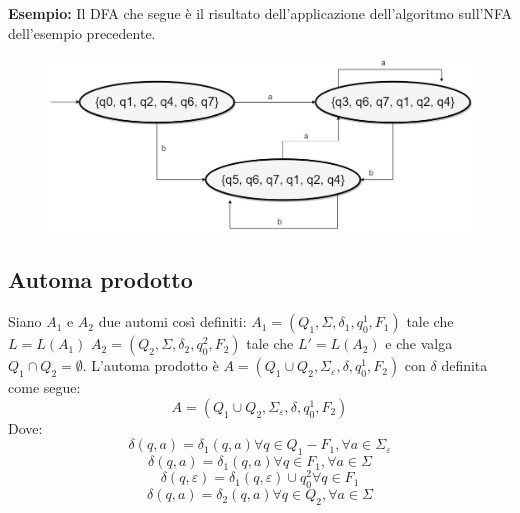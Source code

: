 \textbf{Esempio:} Il DFA che segue \`e il risultato dell'applicazione dell'algoritmo sull'NFA dell'esempio precedente. \newline
\begin{figure}[H]
	\includegraphics[scale=0.35]{l5_3}
\end{figure}
\subsection{Automa prodotto}
Siano $A_1$ e $A_2$ due automi cos\`i definiti:\newline
$A_1 = (Q_1, \Sigma, \delta_1, q^1_0,F_1)$ tale che $L = L(A_1)$ \newline $A_2 = (Q_2, \Sigma, \delta_2, q^2_0,F_2)$ tale che $L' = L(A_2)$  \newline
e che valga $Q_1 \cap Q_2 = \emptyset$. \newline
L'automa prodotto \`e $A = (Q_1 \cup Q_2, \Sigma_{\varepsilon}, \delta, q^1_0, F_2)$ con $\delta$ definita come segue:
\[
	A = (Q_1 \cup Q_2, \Sigma_{\varepsilon}, \delta, q_0^1, F_2)
\]
Dove:
\[
	\delta(q,a) = \delta_1(q,a) \forall  q \in Q_1-F_1, \forall a \in \Sigma_{\varepsilon}
\]
\[
	\delta(q,a) = \delta_1(q,a) \forall  q \in F_1, \forall a \in \Sigma
\]
\[
	\delta(q,\varepsilon) = \delta_1(q,\varepsilon) \cup {q_0^2} \forall  q \in F_1
\]
\[
	\delta(q,a) = \delta_2(q,a) \forall  q \in Q_2, \forall a \in \Sigma
\]


